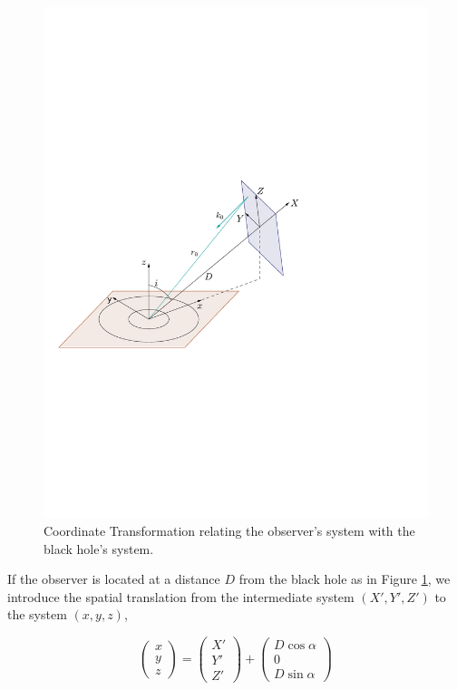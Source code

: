 \begin{figure}[h!]
\begin{center}
\includegraphics[scale=0.7]{figure01.pdf} 
\caption{Coordinate Transformation relating the observer's system with the black hole's system.}
\label{fig: CoordinateTransformation }
\end{center}
\end{figure}

If the observer is located at a distance $D$ from the black hole as in Figure \ref{fig: CoordinateTransformation }, we introduce the spatial translation from the intermediate system $(X',Y',Z')$ to the system $(x,y,z)$,

\begin{equation}
\begin{pmatrix}
x \\
y \\
z
\end{pmatrix} =\begin{pmatrix}
X' \\
Y' \\
Z'
\end{pmatrix} +
\begin{pmatrix}
D \cos \alpha \\
0 \\
D \sin \alpha
\end{pmatrix}
\end{equation}

